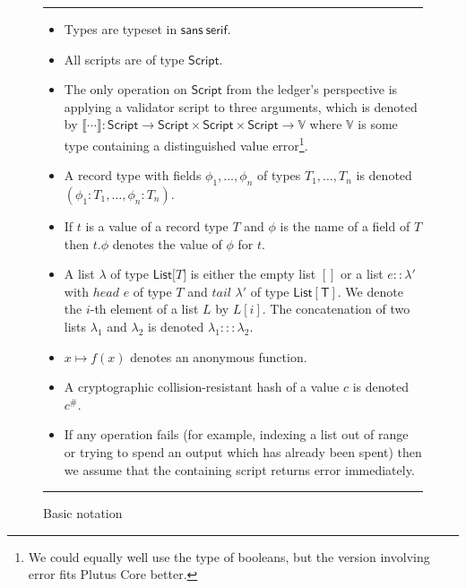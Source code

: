\documentclass[a4paper]{article}
\theoremstyle{definition}  %
\newenvironment{ruledfigure}[1]{\begin{figure}[#1]\hrule\vspace{10pt}}{\vspace{10pt}\hrule\end{figure}}
\begin{document}
\begin{ruledfigure}{H}
\begin{itemize}
\item Types are typeset in $\mathsf{sans~serif}$.

\item All scripts are of type $\mathsf{Script}$.

\item The only operation on $\mathsf{Script}$ from the ledger's
  perspective is applying a validator script to three arguments,
  which is denoted by $\llbracket \cdots \rrbracket :
  \mathsf{Script} \rightarrow \mathsf{Script} \times \mathsf{Script}
    \times \mathsf{Script} \rightarrow \mathbb{V}$ where $\mathbb{V}$
    is some type containing a distinguished value
    \textsf{error}\footnote{We could equally well use the type of
      booleans, but the version involving \textsf{error} fits Plutus
      Core better.}.

\item A record type with fields $\phi_1, \ldots, \phi_n$ of types $T_1,
  \ldots, T_n$ is denoted $(\phi_1 : T_1, \ldots, \phi_n : T_n)$.

\item If $t$ is a value of a record type $T$ and $\phi$ is the name
  of a field of $T$ then $t.\phi$ denotes the value of $\phi$ for
  $t$.
  
\item A list $\lambda$ of type $\mathsf{List[}T\mathsf{]}$ is
    either the empty list $[]$ or a list $e :: \lambda'$ with $head$
    $e$ of type $T$ and $tail$ $\lambda'$ of type
    $\mathsf{List[T]}$. We denote the $i$-th element of a list $L$ by
    $L[i]$.  The concatenation of two lists $\lambda_1$ and
    $\lambda_2$ is denoted $\lambda_1 ::: \lambda_2$.

  \item $x \mapsto f(x)$ denotes an anonymous function.

  \item A cryptographic
    collision-resistant hash of a value $c$ is denoted $c^{\#}$.

  \item If any operation fails (for example, indexing a list out of
    range or trying to spend an output which has already been spent)
    then we assume that the containing script returns \textsf{error}
    immediately.
\end{itemize}
\caption{Basic notation}
\label{fig:basic-notation}
\end{ruledfigure}
\end{document}
